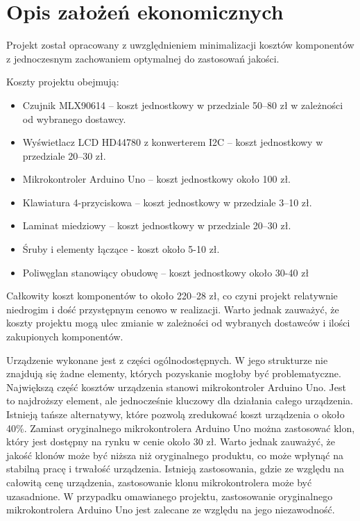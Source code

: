 \section{Opis założeń ekonomicznych}
Projekt został opracowany z uwzględnieniem minimalizacji kosztów komponentów z jednoczesnym zachowaniem optymalnej do zastosowań jakości.

\vspace{12pt}

Koszty projektu obejmują: 

\begin{itemize}
    \item Czujnik MLX90614 – koszt jednostkowy w przedziale 50–80 zł w zależności od wybranego dostawcy.
    \vspace{12pt}
    \item Wyświetlacz LCD HD44780 z konwerterem I2C – koszt jednostkowy w przedziale 20–30 zł.
    \vspace{12pt}
    \item Mikrokontroler Arduino Uno – koszt jednostkowy około 100 zł.
    \vspace{12pt}
    \item Klawiatura 4-przyciskowa – koszt jednostkowy w przedziale 3–10 zł.
    \vspace{12pt} 
    \item Laminat miedziowy – koszt jednostkowy w przedziale 20–30 zł.
    \vspace{12pt}
    \item Śruby i elementy łączące - koszt około 5-10 zł.
    \vspace{12pt}
    \item Poliwęglan stanowiący obudowę – koszt jednostkowy około 30-40 zł
\end{itemize}

\vspace{24pt}

Całkowity koszt komponentów to około 220–28 zł, co czyni projekt relatywnie niedrogim i dość przystępnym cenowo w realizacji. Warto jednak zauważyć, że koszty projektu mogą ulec zmianie w zależności od wybranych dostawców i ilości zakupionych komponentów. 

\vspace{12pt}

Urządzenie wykonane jest z części ogólnodostępnych. W jego strukturze nie znajdują się żadne elementy, których pozyskanie mogłoby być problematyczne. Największą część kosztów urządzenia stanowi mikrokontroler Arduino Uno. Jest to najdroższy element, ale jednocześnie kluczowy dla działania całego urządzenia. Istnieją tańsze alternatywy, które pozwolą zredukować koszt urządzenia o około 40\%. Zamiast oryginalnego mikrokontrolera Arduino Uno można zastosować klon, który jest dostępny na rynku w cenie około 30 zł. Warto jednak zauważyć, że jakość klonów może być niższa niż oryginalnego produktu, co może wpłynąć na stabilną pracę i trwałość urządzenia. Istnieją zastosowania, gdzie ze względu na całowitą cenę urządzenia, zastosowanie klonu mikrokontrolera może być uzasadnione. W przypadku omawianego projektu, zastosowanie oryginalnego mikrokontrolera Arduino Uno jest zalecane ze względu na jego niezawodność.